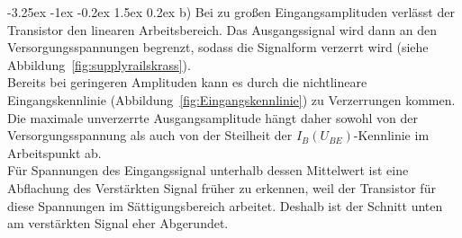 \documentclass[
	a4paper, %
	12pt, %
]{CSUniSchoolLabReport}
\makeatletter
\renewcommand\paragraph{\@startsection{paragraph}{4}{\z@}%
  {-3.25ex \@plus -1ex \@minus -0.2ex}%
  {1.5ex \@plus 0.2ex}%
  {\normalfont\normalsize\bfseries}}
\makeatother
\begin{document}
\paragraph{b)}
Bei zu großen Eingangsamplituden verlässt der Transistor den linearen Arbeitsbereich. Das Ausgangssignal wird dann an den Versorgungsspannungen begrenzt, sodass die Signalform verzerrt wird (siehe Abbildung~\ref{fig:supplyrailskrass}).\\
Bereits bei geringeren Amplituden kann es durch die nichtlineare Eingangskennlinie (Abbildung~\ref{fig:Eingangskennlinie}) zu Verzerrungen kommen. Die maximale unverzerrte Ausgangsamplitude hängt daher sowohl von der Versorgungsspannung als auch von der Steilheit der $I_B(U_{BE})$-Kennlinie im Arbeitspunkt ab.\\ 
Für Spannungen des Eingangssignal unterhalb dessen Mittelwert ist eine Abflachung des Verstärkten Signal früher zu erkennen, weil der Transistor für diese Spannungen im Sättigungsbereich arbeitet. Deshalb ist der Schnitt unten am verstärkten Signal eher Abgerundet. 
\end{document}
